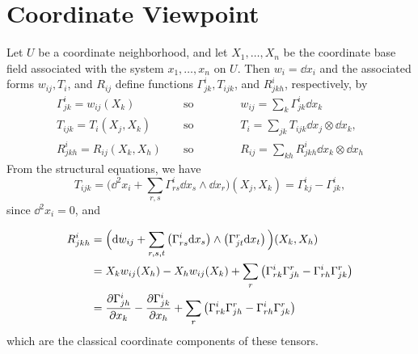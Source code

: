 \documentclass[../main]{subfiles}
\begin{document}
\section{Coordinate Viewpoint}\label{ch05:s3}

Let $U$ be a coordinate neighborhood, and let $X_{1}, \ldots, X_{n}$ be the coordinate base field associated with the system $x_{1}, \ldots, x_{n}$ on $U .$ Then $w_{i}=\dd x_{i}$ and the associated forms $w_{i j}, T_{i}$, and $R_{i j}$ define functions $\Gamma_{j k}^{i}, T_{i j k}$, and $R_{j k h}^{i}$, respectively, by
\begin{align*}
\Gamma_{j k}^{i}=w_{i j}(X_{k}) && \text { so } \quad\quad\quad&w_{ij}=\sum_{k} \Gamma_{j k}^{i} \dd x_{k} \\
T_{i j k}=T_{i}(X_{j}, X_{k}) &&\text { so } \quad\quad\quad & T_{i}=\sum_{j k} T_{i j k} \dd x_{j} \otimes \dd x_k, \\
R_{j k h}^{i}=R_{i j}(X_{k}, X_{h}) && \text { so } \quad \quad\quad& R_{i j}=\sum_{k h} R_{j k h}^{i} \dd x_{k} \otimes \dd x_h
\end{align*}
From the structural equations, we have
\[
T_{i j k}=\Big(\dd^{2} x_{i}+\sum_{r,s} \Gamma_{r s}^{i} \dd x_{s} \wedge \dd x_{r}\Big)(X_{j}, X_{k})=\Gamma_{k j}^{i}-\Gamma_{j k}^{i},
\]
since $\dd^{2} x_{i}=0$, and

\begin{align*}
R_{j k h}^{i} &=\Big(\mathrm{d}w_{i j}+\sum_{r,s,t}\left(\Gamma_{r s}^{i} \mathrm{d}x_{s}\right) \wedge\left(\Gamma_{j t}^{r} \mathrm{d}x_{t}\right)\Big)(X_{k}, X_{h}) \\
&=X_{k} w_{i j}(X_{h})-X_{h} w_{i j}(X_{k})+\sum_{r} \big(\Gamma^i_{rk} \Gamma^r_{jh}-\Gamma_{r h}^{i} \Gamma_{j k}^{r}\big)\\
&=\dfrac{\partial \Gamma_{j h}^{i}}{\partial x_{k}}-\dfrac{\partial \Gamma_{j k}^{i}}{\partial x_{h}}+\sum_{r} \big(\Gamma^i_{rk} \Gamma^r_{jh}-\Gamma_{r h}^{i} \Gamma_{j k}^{r}\big)
\end{align*}
which are the classical coordinate components of these tensors.
\end{document}
